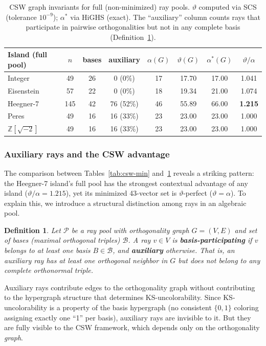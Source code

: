 \documentclass[12pt,a4paper]{article}
\newtheorem{definition}[theorem]{Definition}
\newcommand{\Z}{\mathbb{Z}}
\begin{document}
\begin{table}[ht]
\centering
\caption{CSW graph invariants for full (non-minimized) ray pools. $\vartheta$ computed via SCS (tolerance $10^{-9}$); $\alpha^*$ via HiGHS (exact). The ``auxiliary'' column counts rays that participate in pairwise orthogonalities but not in any complete basis (Definition~\ref{def:auxiliary}).}
\label{tab:csw-pool}
\begin{tabular}{lccccccc}
\toprule
Island (full pool) & $n$ & bases & auxiliary & $\alpha(G)$ & $\vartheta(G)$ & $\alpha^*(G)$ & $\vartheta/\alpha$ \\
\midrule
Integer & 49 & 26 & 0 (0\%) & 17 & 17.70 & 17.00 & 1.041 \\
Eisenstein & 57 & 22 & 0 (0\%) & 18 & 19.34 & 21.00 & 1.074 \\
Heegner-7 & 145 & 42 & 76 (52\%) & 46 & 55.89 & 66.00 & \textbf{1.215} \\
Peres & 49 & 16 & 16 (33\%) & 23 & 23.00 & 23.00 & 1.000 \\
$\Z[\sqrt{-2}]$ & 49 & 16 & 16 (33\%) & 23 & 23.00 & 23.00 & 1.000 \\
\bottomrule
\end{tabular}
\end{table}

\subsubsection{Auxiliary rays and the CSW advantage}

The comparison between Tables~\ref{tab:csw-min} and~\ref{tab:csw-pool} reveals a striking pattern: the Heegner-7 island's full pool has the strongest contextual advantage of any island ($\vartheta/\alpha = 1.215$), yet its minimized 43-vector set is $\vartheta$-perfect ($\vartheta = \alpha$). To explain this, we introduce a structural distinction among rays in an algebraic pool.

\begin{definition}\label{def:auxiliary}
Let $\mathcal{P}$ be a ray pool with orthogonality graph $G = (V, E)$ and set of bases (maximal orthogonal triples) $\mathcal{B}$. A ray $v \in V$ is \textbf{basis-participating} if $v$ belongs to at least one basis $B \in \mathcal{B}$, and \textbf{auxiliary} otherwise. That is, an auxiliary ray has at least one orthogonal neighbor in $G$ but does not belong to any complete orthonormal triple.
\end{definition}

Auxiliary rays contribute edges to the orthogonality graph without contributing to the hypergraph structure that determines KS-uncolorability. Since KS-uncolorability is a property of the basis hypergraph (no consistent $\{0,1\}$ coloring assigning exactly one ``1'' per basis), auxiliary rays are invisible to it. But they are fully visible to the CSW framework, which depends only on the orthogonality \emph{graph}.
\end{document}
